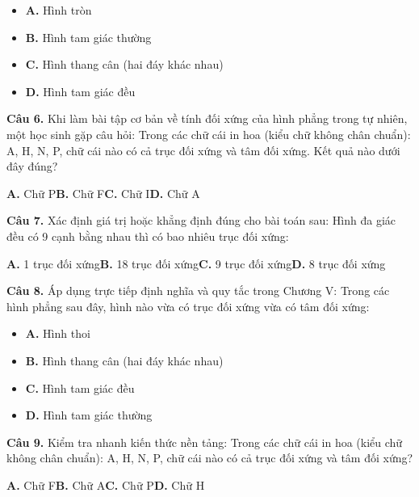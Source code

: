 \documentclass[11pt,a4paper]{article}
\begin{document}
\begin{itemize}\setlength{\itemsep}{1pt}\setlength{\parskip}{0pt}
  \item[] \textbf{A.} Hình tròn
  \item[] \textbf{B.} Hình tam giác thường
  \item[] \textbf{C.} Hình thang cân (hai đáy khác nhau)
  \item[] \textbf{D.} Hình tam giác đều
\end{itemize}\vspace{2pt}
\textbf{\color{primary} Câu 6.} Khi làm bài tập cơ bản về tính đối xứng của hình phẳng trong tự nhiên, một học sinh gặp câu hỏi: Trong các chữ cái in hoa (kiểu chữ không chân chuẩn): A, H, N, P, chữ cái nào có cả trục đối xứng và tâm đối xứng. Kết quả nào dưới đây đúng?\par
\hspace*{1.5em}\textbf{A.} Chữ P\quad\quad \textbf{B.} Chữ F\quad\quad \textbf{C.} Chữ I\quad\quad \textbf{D.} Chữ A\par\vspace{2pt}
\textbf{\color{primary} Câu 7.} Xác định giá trị hoặc khẳng định đúng cho bài toán sau: Hình đa giác đều có 9 cạnh bằng nhau thì có bao nhiêu trục đối xứng:\par
\hspace*{1.5em}\textbf{A.} 1 trục đối xứng\quad\quad \textbf{B.} 18 trục đối xứng\quad\quad \textbf{C.} 9 trục đối xứng\quad\quad \textbf{D.} 8 trục đối xứng\par\vspace{2pt}
\textbf{\color{primary} Câu 8.} Áp dụng trực tiếp định nghĩa và quy tắc trong Chương V: Trong các hình phẳng sau đây, hình nào vừa có trục đối xứng vừa có tâm đối xứng:\par
\begin{itemize}\setlength{\itemsep}{1pt}\setlength{\parskip}{0pt}
  \item[] \textbf{A.} Hình thoi
  \item[] \textbf{B.} Hình thang cân (hai đáy khác nhau)
  \item[] \textbf{C.} Hình tam giác đều
  \item[] \textbf{D.} Hình tam giác thường
\end{itemize}\vspace{2pt}
\textbf{\color{primary} Câu 9.} Kiểm tra nhanh kiến thức nền tảng: Trong các chữ cái in hoa (kiểu chữ không chân chuẩn): A, H, N, P, chữ cái nào có cả trục đối xứng và tâm đối xứng?\par
\hspace*{1.5em}\textbf{A.} Chữ F\quad\quad \textbf{B.} Chữ A\quad\quad \textbf{C.} Chữ P\quad\quad \textbf{D.} Chữ H\par\vspace{2pt}
\end{document}
